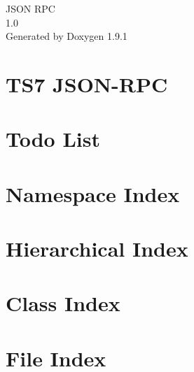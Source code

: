 \let\mypdfximage\pdfximage\def\pdfximage{\immediate\mypdfximage}\documentclass[twoside]{book}
\newcommand{\+}{\discretionary{\mbox{\scriptsize$\hookleftarrow$}}{}{}}
\newcommand{\clearemptydoublepage}{%
  \newpage{\pagestyle{empty}\cleardoublepage}%
}
\begin{document}
\raggedbottom

\hypersetup{pageanchor=false,
             bookmarksnumbered=true,
             pdfencoding=unicode
            }
\begin{titlepage}
\vspace*{7cm}
\begin{center}%
{\Large JSON RPC \\[1ex]\large 1.\+0 }\\
\vspace*{1cm}
{\large Generated by Doxygen 1.9.1}\\
\end{center}
\end{titlepage}
\clearemptydoublepage
{}
\tableofcontents
\clearemptydoublepage
{}
\hypersetup{pageanchor=true}

\chapter{TS7 JSON-\/\+RPC}
\label{index}\hypertarget{index}{}
\chapter{Todo List}
\label{todo}

\chapter{Namespace Index}

\chapter{Hierarchical Index}

\chapter{Class Index}

\chapter{File Index}

\end{document}
